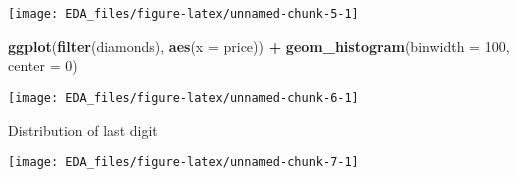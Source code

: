 \documentclass[]{book}
\newenvironment{Shaded}{\begin{snugshade}}{\end{snugshade}}
\newcommand{\DataTypeTok}[1]{\textcolor[rgb]{0.13,0.29,0.53}{#1}}
\newcommand{\DecValTok}[1]{\textcolor[rgb]{0.00,0.00,0.81}{#1}}
\newcommand{\KeywordTok}[1]{\textcolor[rgb]{0.13,0.29,0.53}{\textbf{#1}}}
\newcommand{\NormalTok}[1]{#1}
\newcommand{\OperatorTok}[1]{\textcolor[rgb]{0.81,0.36,0.00}{\textbf{#1}}}
\newcommand{\StringTok}[1]{\textcolor[rgb]{0.31,0.60,0.02}{#1}}
\theoremstyle{plain}
\theoremstyle{remark}
\theoremstyle{definition}
\theoremstyle{definition}
\theoremstyle{definition}
\theoremstyle{remark}
\begin{document}
\begin{center}\texttt{[image: EDA\_files/figure-latex/unnamed-chunk-5-1]} \end{center}

\begin{Shaded}
\begin{Highlighting}[]
\KeywordTok{ggplot}\NormalTok{(}\KeywordTok{filter}\NormalTok{(diamonds), }\KeywordTok{aes}\NormalTok{(}\DataTypeTok{x =}\NormalTok{ price)) }\OperatorTok{+}
\StringTok{  }\KeywordTok{geom_histogram}\NormalTok{(}\DataTypeTok{binwidth =} \DecValTok{100}\NormalTok{, }\DataTypeTok{center =} \DecValTok{0}\NormalTok{)}
\end{Highlighting}
\end{Shaded}

\begin{center}\texttt{[image: EDA\_files/figure-latex/unnamed-chunk-6-1]} \end{center}

Distribution of last digit

\begin{Shaded}
\end{Shaded}

\begin{center}\texttt{[image: EDA\_files/figure-latex/unnamed-chunk-7-1]} \end{center}

\begin{Shaded}
\end{Shaded}
\end{document}
